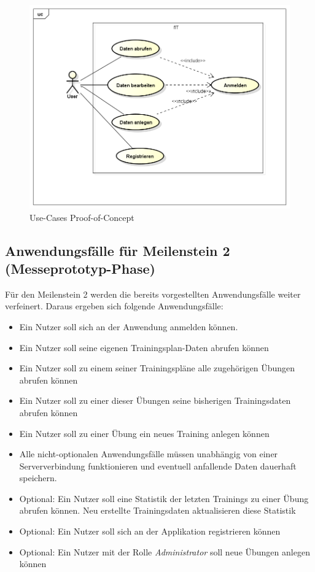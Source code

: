 \begin{figure}[h]
\centering
\includegraphics[width=0.8\linewidth]{content/images/UseCase-Proof-of-Concept.png}
\caption{Use-Cases Proof-of-Concept}
\label{pic:usecase-poc}
\end{figure}

\subsection{Anwendungsfälle für Meilenstein 2 (Messeprototyp-Phase)}
\label{ssec:anwendungsfaelle-messe}
Für den Meilenstein 2 werden die bereits vorgestellten Anwendungsfälle weiter verfeinert. Daraus ergeben sich folgende Anwendungsfälle:
\begin{itemize}
\item Ein Nutzer soll sich an der Anwendung anmelden können.
\item Ein Nutzer soll seine eigenen Trainingsplan-Daten abrufen können
\item Ein Nutzer soll zu einem seiner Trainingspläne alle zugehörigen Übungen abrufen können
\item Ein Nutzer soll zu einer dieser Übungen seine bisherigen Trainingsdaten abrufen können
\item Ein Nutzer soll zu einer Übung ein neues Training anlegen können
\item Alle nicht-optionalen Anwendungsfälle müssen unabhängig von einer Serververbindung funktionieren und eventuell anfallende Daten dauerhaft speichern.
\item Optional: Ein Nutzer soll eine Statistik der letzten Trainings zu einer Übung abrufen können. Neu erstellte Trainingsdaten aktualisieren diese Statistik
\item Optional: Ein Nutzer soll sich an der Applikation registrieren können
\item Optional: Ein Nutzer mit der Rolle \textit{Administrator} soll neue Übungen anlegen können
\end{itemize}

